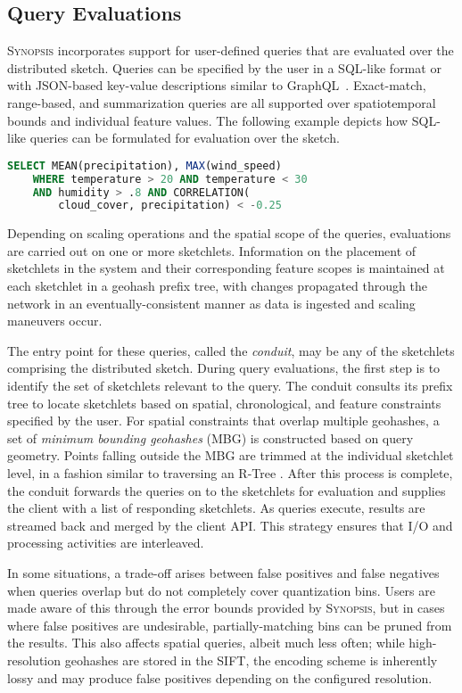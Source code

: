 \subsection{Query Evaluations}
\label{subsec:query-eval}
\textsc{Synopsis} incorporates support for user-defined queries that are evaluated over the distributed sketch.  Queries can be specified by the user in a SQL-like format or with JSON-based key-value descriptions similar to GraphQL~\cite{graphql}. Exact-match, range-based, and summarization queries are all supported over spatiotemporal bounds and individual feature values. The following example depicts how SQL-like queries can be formulated for evaluation over the sketch.

\begin{lstlisting}[language=SQL,style=custompy]
    SELECT MEAN(precipitation), MAX(wind_speed)
    WHERE temperature > 20 AND temperature < 30
    AND humidity > .8 AND CORRELATION(
        cloud_cover, precipitation) < -0.25
\end{lstlisting}

Depending on scaling operations and the spatial scope of the queries, evaluations are carried out on one or more sketchlets. Information on the placement of sketchlets in the system and their corresponding feature scopes is maintained at each sketchlet in a geohash prefix tree, with changes propagated through the network in an eventually-consistent manner as data is ingested and scaling maneuvers occur.

The entry point for these queries, called the \emph{conduit}, may be any of the sketchlets comprising the distributed sketch. During query evaluations, the first step is to identify the set of sketchlets relevant to the query. The conduit consults its prefix tree to locate sketchlets based on spatial, chronological, and feature constraints specified by the user. For spatial constraints that overlap multiple geohashes, a set of \emph{minimum bounding geohashes} (MBG) is constructed based on query geometry. Points falling outside the MBG are trimmed at the individual sketchlet level, in a fashion similar to traversing an R-Tree \cite{guttman1984r}.  After this process is complete, the conduit forwards the queries on to the sketchlets for evaluation and supplies the client with a list of responding sketchlets.  As queries execute, results are streamed back and merged by the client API. This strategy ensures that I/O and processing activities are interleaved.

In some situations, a trade-off arises between false positives and false negatives when queries overlap but do not completely cover quantization bins. Users are made aware of this through the error bounds provided by \textsc{Synopsis}, but in cases where false positives are undesirable, partially-matching bins can be pruned from the results. This also affects spatial queries, albeit much less often; while high-resolution geohashes are stored in the SIFT, the encoding scheme is inherently lossy and may produce false positives depending on the configured resolution.

